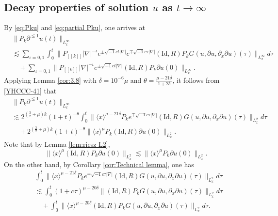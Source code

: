 \documentclass[11pt,twoside]{article}
\def\f{\frac}
\def\p{\partial}
\def\ls{\lesssim}
\newcommand{\w}[1]{\langle {#1} \rangle}
\theoremstyle{plain}
\theoremstyle{definition}
\numberwithin{equation}{section}
\begin{document}
\subsection{Decay properties of solution $u$ as $t \to \infty$}


By \eqref{eq:Pku} and \eqref{eq:partial Pku}, one arrives at
\begin{equation}\label{YHCCC-41}
\begin{split}
&\|P_k\p^{\le 1} u(t)\|_{L^\infty_x}\\
&\ls
\sum_{\iota=0,1}\int_{0}^{t}\big\|P_{[[k]]}|\nabla|^{-\iota}e^{\pm \sqrt{-1}ct|\nabla|}e^{\mp \sqrt{-1}c\tau|\nabla|} (\mathrm{Id},R)
P_kG(u,\p u,\p_x\p u)(\tau)\big\|_{L^\infty_x}d\tau\\
&\quad+\sum_{\iota=0,1}\|P_{[[k]]}|\nabla|^{-\iota}e^{\pm \sqrt{-1}ct|\nabla|} (\mathrm{Id},R)P_k\partial u(0)\|_{L^\infty_x}.
\end{split}
\end{equation}
Applying Lemma \ref{cor:3.8} with $\delta=10^{-6}\mu$ and $\theta = \frac{\mu-21\delta}{1+2\delta}$, it follows from \eqref{YHCCC-41} that
\begin{equation}\label{6.34}
\begin{split}
&\|P_k\p^{\le 1} u(t)\|_{L^\infty_x}\\
&\ls
2^{(\f32+\mu) k}(1+t)^{-\theta}
\int_{0}^{t}\big\|\w{x}^{\mu-21\delta}P_ke^{\mp \sqrt{-1}c\tau|\nabla|} (\mathrm{Id},R) G(u,\p u,\p_x\p u)(\tau)\big\|_{L^2_x}d\tau\\
&\quad+2^{(\f32+\mu) k}(1+t)^{-\theta}
\|\w{x}^{\mu}P_k(\mathrm{Id},R)\partial u(0)\|_{L^2_x}.
\end{split}
\end{equation}
Note that by Lemma \ref{lem:riesz L2},
\begin{equation}\label{6.35}
\|\w{x}^{\mu}(\mathrm{Id},R)P_k\partial u(0)\|_{L^2_x}
\ls
\|\w{x}^{\mu}P_k\partial u(0)\|_{L^2_x}.
\end{equation}
On the other hand, by Corollary \ref{cor:Technical lemma}, one has
\begin{equation*}
\begin{split}
&\int_{0}^{t}\big\|\w{x}^{\mu-21\delta}P_ke^{\mp \sqrt{-1}c\tau|\nabla|} (\mathrm{Id},R) G(u,\partial u,\p_x\p u)(\tau)\big\|_{L^2_x}d\tau\\
&\ls\int_{0}^{t}(1+c\tau)^{\mu-20\delta}\big\|(\mathrm{Id},R) P_kG(u,\partial u,\p_x\p u)(\tau)\big\|_{L^2_x}d\tau\\
&\quad+\int_{0}^{t}\big\|\w{x}^{\mu-20\delta}(\mathrm{Id},R)P_k G(u,\partial u,\p_x\p u)(\tau)\big\|_{L^2_x}d\tau.
\end{split}
\end{equation*}
\end{document}
